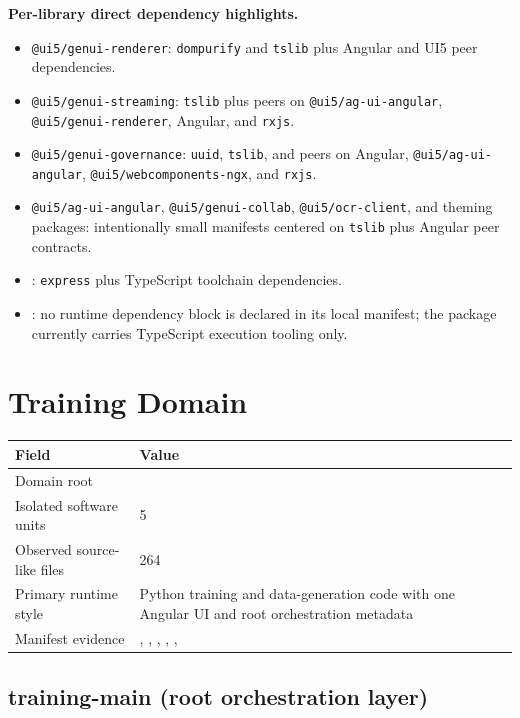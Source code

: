 \documentclass[11pt,a4paper]{article}
\begin{document}
\textbf{Per-library direct dependency highlights.}
\begin{itemize}[leftmargin=*]
    \item \texttt{@ui5/genui-renderer}: \texttt{dompurify} and \texttt{tslib} plus Angular and UI5 peer dependencies.
    \item \texttt{@ui5/genui-streaming}: \texttt{tslib} plus peers on \texttt{@ui5/ag-ui-angular}, \texttt{@ui5/genui-renderer}, Angular, and \texttt{rxjs}.
    \item \texttt{@ui5/genui-governance}: \texttt{uuid}, \texttt{tslib}, and peers on Angular, \texttt{@ui5/ag-ui-angular}, \texttt{@ui5/webcomponents-ngx}, and \texttt{rxjs}.
    \item \texttt{@ui5/ag-ui-angular}, \texttt{@ui5/genui-collab}, \texttt{@ui5/ocr-client}, and theming packages: intentionally small manifests centered on \texttt{tslib} plus Angular peer contracts.
    \item {}: \texttt{express} plus TypeScript toolchain dependencies.
    \item {}: no runtime dependency block is declared in its local manifest; the package currently carries TypeScript execution tooling only.
\end{itemize}

\newpage
\section{Training Domain}

\begin{tabular}{@{}P{4.2cm}P{9.8cm}@{}}
\toprule
\textbf{Field} & \textbf{Value} \\
\midrule
Domain root &  \\
Isolated software units & 5 \\
Observed source-like files & 264 \\
Primary runtime style & Python training and data-generation code with one Angular UI and root orchestration metadata \\
Manifest evidence & , , , , ,  \\
\bottomrule
\end{tabular}

\subsection{training-main (root orchestration layer)}
\end{document}
